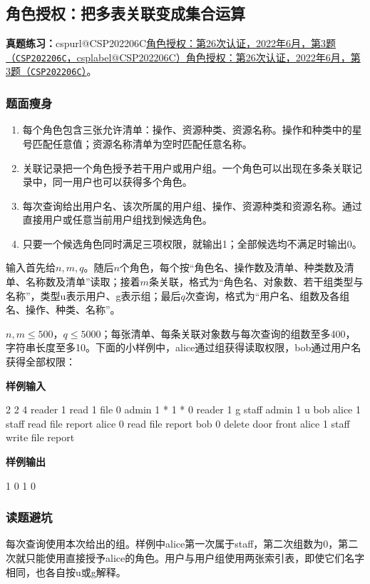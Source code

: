 \documentclass[UTF8,11pt,a4paper,fontset=none]{ctexart}
\makeatletter
\newcommand{\csp}[2]{\ifcsname cspurl@#1\endcsname\href{\csname cspurl@#1\endcsname}{#2（\texttt{#1}，\csname csplabel@#1\endcsname）}\else\href{https://oj.shumeng.tech/p/#1}{#2（\texttt{#1}）}\fi}
\newcommand{\ojpractice}[2]{\par\noindent\textbf{真题练习：}\csp{#1}{#2}。\par}
\makeatother
\begin{document}
\subsection{角色授权：把多表关联变成集合运算}
\ojpractice{CSP202206C}{角色授权：第26次认证，2022年6月，第3题}
\subsubsection{题面瘦身}
\begin{enumerate}
\item 每个角色包含三张允许清单：操作、资源种类、资源名称。操作和种类中的星号匹配任意值；资源名称清单为空时匹配任意名称。
\item 关联记录把一个角色授予若干用户或用户组。一个角色可以出现在多条关联记录中，同一用户也可以获得多个角色。
\item 每次查询给出用户名、该次所属的用户组、操作、资源种类和资源名称。通过直接用户或任意当前用户组找到候选角色。
\item 只要一个候选角色同时满足三项权限，就输出1；全部候选均不满足时输出0。
\end{enumerate}
输入首先给$n,m,q$。随后$n$个角色，每个按“角色名、操作数及清单、种类数及清单、名称数及清单”读取；接着$m$条关联，格式为“角色名、对象数、若干组类型与名称”，类型u表示用户、g表示组；最后$q$次查询，格式为“用户名、组数及各组名、操作、种类、名称”。

$n,m\le500$，$q\le5000$；每张清单、每条关联对象数与每次查询的组数至多400，字符串长度至多10。下面的小样例中，alice通过组获得读取权限，bob通过用户名获得全部权限：
\begin{tcolorbox}[samplebox,title={输入输出样例}]
\textbf{样例输入}
\begin{Sample}
2 2 4
reader 1 read 1 file 0
admin 1 * 1 * 0
reader 1 g staff
admin 1 u bob
alice 1 staff read file report
alice 0 read file report
bob 0 delete door front
alice 1 staff write file report
\end{Sample}
\tcblower
\textbf{样例输出}
\begin{Sample}
1
0
1
0
\end{Sample}
\end{tcolorbox}

\subsubsection{读题避坑}
每次查询使用本次给出的组。样例中alice第一次属于staff，第二次组数为0，第二次就只能使用直接授予alice的角色。用户与用户组使用两张索引表，即使它们名字相同，也各自按u或g解释。
\end{document}
